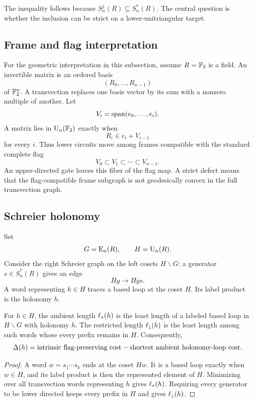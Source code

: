 The inequality follows because $S_n^\downarrow(R)\subseteq S_n^*(R)$.  The central question is whether the inclusion can be strict on a lower-unitriangular target.

\subsection{Frame and flag interpretation}

For the geometric interpretation in this subsection, assume $R=\mathbb F_2$ is a field.  An invertible matrix is an ordered basis
\[
(R_0,\ldots,R_{n-1})
\]
of $\mathbb F_2^n$.  A transvection replaces one basis vector by its sum with a nonzero multiple of another.  Let
\[
V_i=\operatorname{span}(e_0,\ldots,e_i).
\]
A matrix lies in $\operatorname{U}_n(\mathbb F_2)$ exactly when
\[
R_i\in e_i+V_{i-1}
\]
for every $i$.  Thus lower circuits move among frames compatible with the standard complete flag
\[
V_0\subset V_1\subset\cdots\subset V_{n-1}.
\]
An upper-directed gate leaves this fiber of the flag map.  A strict defect means that the flag-compatible frame subgraph is not geodesically convex in the full transvection graph.

\subsection{Schreier holonomy}

Set
\[
G=\operatorname{E}_n(R),
\qquad
H=\operatorname{U}_n(R).
\]
Consider the right Schreier graph on the left cosets $H\backslash G$: a generator $s\in S_n^*(R)$ gives an edge
\[
Hg\longrightarrow Hgs.
\]
A word representing $h\in H$ traces a based loop at the coset $H$.  Its label product is the holonomy $h$.

\begin{proposition}\label{g:prop:schreier-holonomy}
For $h\in H$, the ambient length $\ell_{*}(h)$ is the least length of a labeled based loop in $H\backslash G$ with holonomy $h$.  The restricted length $\ell_{\downarrow}(h)$ is the least length among such words whose every prefix remains in $H$.  Consequently,
\[
\Delta(h)
=
\text{intrinsic flag-preserving cost}
-
\text{shortest ambient holonomy-loop cost}.
\]
\end{proposition}

\begin{proof}
A word $w=s_1\cdots s_k$ ends at the coset $Hw$.  It is a based loop exactly when $w\in H$, and its label product is then the represented element of $H$.  Minimizing over all transvection words representing $h$ gives $\ell_{*}(h)$.  Requiring every generator to be lower directed keeps every prefix in $H$ and gives $\ell_{\downarrow}(h)$.
\end{proof}

